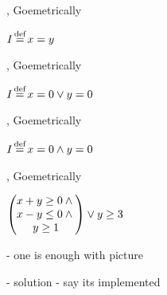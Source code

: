 \documentclass[xcolor={dvipsnames,svgnames,table}]{beamer}
\newcommand{\defeq}{\stackrel{\mathclap{\normalfont\mbox{\scriptsize def}}}{=}}
\begin{document}
\begin{frame}{\iconfluence{}, Goemetrically}
  \begin{center}
    $I \defeq x = y$

  \end{center}
\end{frame}

\begin{frame}{\iconfluence{}, Goemetrically}
  \begin{center}
    $I \defeq x = 0 \lor y = 0$

  \end{center}
\end{frame}

\begin{frame}{\iconfluence{}, Goemetrically}
  \begin{center}
    $I \defeq x = 0 \land y = 0$

  \end{center}
\end{frame}

\begin{frame}{\iconfluence{}, Goemetrically}
  \begin{center}
    $\begin{pmatrix}
      x + y \geq 0 \land {} \\
      x - y \leq 0 \land {} \\
      y \geq 1
     \end{pmatrix} \lor y \geq 3$

  \end{center}
\end{frame}

\begin{frame}
  - one is enough with picture
\end{frame}

\begin{frame}
  - solution
  - say its implemented
\end{frame}
\end{document}
